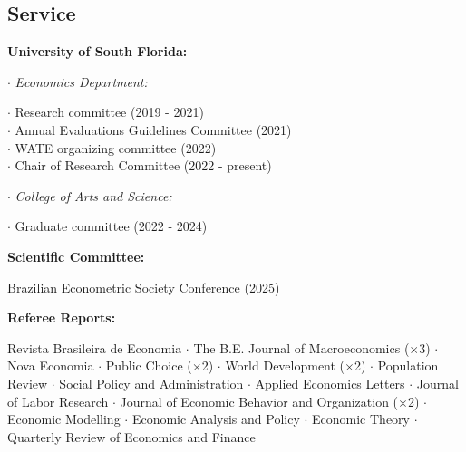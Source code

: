 \documentclass[mm, 10pt]{simple_style}
\begin{document}
\begin{resume}


\section{Service}

\textbf{University of South Florida:} 

$\cdot$ \indent \textit{Economics Department:} \\
\indent \hspace{1cm}  \begin{minipage}[t]{0.75\textwidth}
        $\cdot$ Research committee (2019 - 2021) \\
        $\cdot$ Annual Evaluations Guidelines Committee (2021) \\
        $\cdot$ WATE organizing committee (2022) \\
        $\cdot$ Chair of Research Committee (2022 - present)
        \end{minipage}

\clearpage
$\cdot$ \indent \textit{College of Arts and Science:} \\
\indent \hspace{1cm}  \begin{minipage}[t]{0.75\textwidth}
        $\cdot$ Graduate committee (2022 - 2024)  \\
        \end{minipage}

\textbf{Scientific Committee:} \\
\indent \hspace{1cm}  \begin{minipage}[t]{0.75\textwidth}
{Brazilian Econometric Society Conference (2025)}
\end{minipage}

\textbf{Referee Reports:} \\
\indent \hspace{1cm}  \begin{minipage}[t]{0.75\textwidth}
Revista Brasileira de Economia 
$\cdot$ The B.E. Journal of Macroeconomics ($\times$3) 
$\cdot$ Nova Economia 
$\cdot$ Public Choice ($\times$2) 
$\cdot$ World Development ($\times$2)
$\cdot$ Population Review 
$\cdot$ Social Policy and Administration 
$\cdot$ Applied Economics Letters 
$\cdot$ Journal of Labor Research
$\cdot$ Journal of Economic Behavior and Organization ($\times$2)
$\cdot$ Economic Modelling
$\cdot$ Economic Analysis and Policy
$\cdot$ Economic Theory
$\cdot$ Quarterly Review of Economics and Finance


\end{minipage}
\end{resume}
\end{document}
